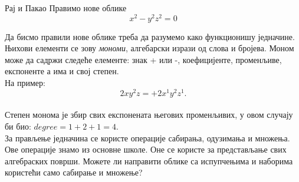 \begin{surferPage}{Рај и Пакао}
Правимо нове облике \\
\smallskip
\[x^2	- y^2z^2	= 0\]

\singlespacing
Да бисмо правили нове облике треба да разумемо како функционишу једначине. Њихови елементи се зову {\it мономи}, алгебарски изрази од слова и бројева.
\singlespacing
Моном може да садржи следеће елементе:
знак + или -, коефицијенте, променљиве, експоненте а има и свој степен.\\
\singlespacing
На пример: 
\smallskip
\[2xy^2z = +2x^1y^2z^1.\]
\\
\smallskip
Степен монома је збир свих експонената његових променљивих, у овом случају би био: $degree = 1+2+1=4$.  \\
\singlespacing
За прављење једначина се користе операције сабирања, одузимања и множења. Ове операције знамо из основне школе. Оне се користе за представљање свих алгебраских површи.
\singlespacing
Можете ли направити облике са испупчењима и наборима користећи само сабирање и множење?
\end{surferPage}
